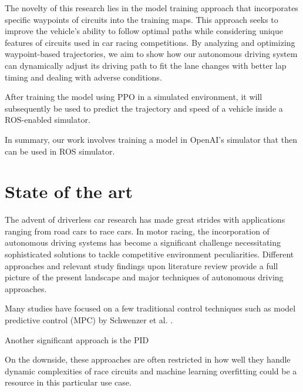 \documentclass[conference]{IEEEtran}
\begin{document}
The novelty of this research lies in the model training approach that incorporates specific waypoints of circuits into the training maps.
%
This approach seeks to improve the vehicle’s ability to follow optimal paths while considering unique features of circuits used in car racing competitions.
%
By analyzing and optimizing waypoint-based trajectories, we aim to show how our autonomous driving system can dynamically adjust its driving path to fit the lane changes with better lap timing and dealing with adverse conditions.

After training the model using PPO in a simulated environment, it will subsequently be used to predict the trajectory and speed of a vehicle inside a ROS-enabled simulator.

In summary, our work involves training a model in OpenAI’s simulator that then can be used in ROS simulator.

\section{State of the art}




The advent of driverless car research has made great strides with applications ranging from road cars to race cars.
%
In motor racing, the incorporation of autonomous driving systems has become a significant challenge necessitating sophisticated solutions to tackle competitive environment peculiarities.
%
Different approaches and relevant study findings upon literature review provide a full picture of the present landscape and major techniques of autonomous driving approaches.

Many studies have focused on a few traditional control techniques such as model predictive control (MPC) by Schwenzer et al. \cite{MPC}. 

Another significant approach is the PID \cite{ADAPTIVE_PID}

On the downside, these approaches are often restricted in how well they handle dynamic complexities of race circuits and machine learning overfitting could be a resource in this particular use case.
\end{document}
